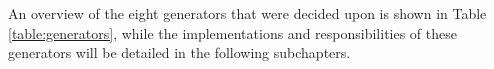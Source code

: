 An overview of the eight generators that were decided upon is shown in Table \ref{table:generators}, while the implementations and responsibilities of these generators will be detailed in the following subchapters.








